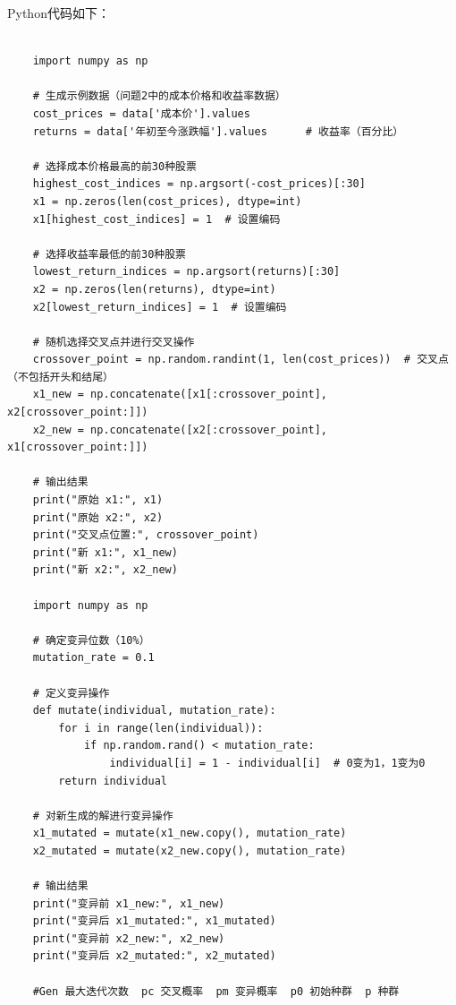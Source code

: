 \documentclass[journal,twoside,web]{ieeecolor}
\begin{document}
Python代码如下：
\begin{lstlisting}

    import numpy as np

    # 生成示例数据（问题2中的成本价格和收益率数据）
    cost_prices = data['成本价'].values
    returns = data['年初至今涨跌幅'].values      # 收益率（百分比）
    
    # 选择成本价格最高的前30种股票
    highest_cost_indices = np.argsort(-cost_prices)[:30]
    x1 = np.zeros(len(cost_prices), dtype=int)
    x1[highest_cost_indices] = 1  # 设置编码
    
    # 选择收益率最低的前30种股票
    lowest_return_indices = np.argsort(returns)[:30]
    x2 = np.zeros(len(returns), dtype=int)
    x2[lowest_return_indices] = 1  # 设置编码
    
    # 随机选择交叉点并进行交叉操作
    crossover_point = np.random.randint(1, len(cost_prices))  # 交叉点（不包括开头和结尾）
    x1_new = np.concatenate([x1[:crossover_point], x2[crossover_point:]])
    x2_new = np.concatenate([x2[:crossover_point], x1[crossover_point:]])
    
    # 输出结果
    print("原始 x1:", x1)
    print("原始 x2:", x2)
    print("交叉点位置:", crossover_point)
    print("新 x1:", x1_new)
    print("新 x2:", x2_new)
    
    import numpy as np
    
    # 确定变异位数（10%）
    mutation_rate = 0.1
    
    # 定义变异操作
    def mutate(individual, mutation_rate):
        for i in range(len(individual)):
            if np.random.rand() < mutation_rate:
                individual[i] = 1 - individual[i]  # 0变为1，1变为0
        return individual
    
    # 对新生成的解进行变异操作
    x1_mutated = mutate(x1_new.copy(), mutation_rate)
    x2_mutated = mutate(x2_new.copy(), mutation_rate)
    
    # 输出结果
    print("变异前 x1_new:", x1_new)
    print("变异后 x1_mutated:", x1_mutated)
    print("变异前 x2_new:", x2_new)
    print("变异后 x2_mutated:", x2_mutated)
    
    #Gen 最大迭代次数  pc 交叉概率  pm 变异概率  p0 初始种群  p 种群
\end{lstlisting}
\end{document}
